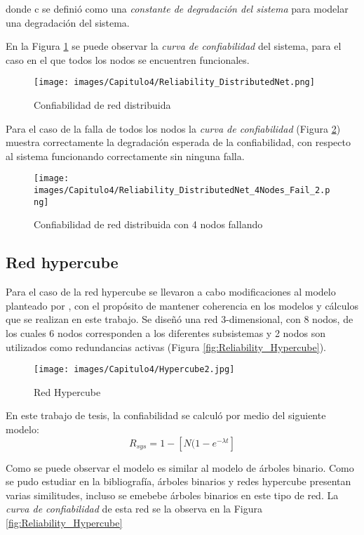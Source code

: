 donde c se definió como una \textit{constante de degradación del sistema} para modelar una degradación del sistema.

En la Figura \ref{fig:reliability_distributedNet} se puede observar la \textit{curva de confiabilidad} del sistema, para el caso en el que todos los nodos se encuentren funcionales.

\begin{figure}[H]
 \centering
 \texttt{[image: images/Capitulo4/Reliability\_DistributedNet.png]}
  \caption{Confiabilidad de red distribuida}
\label{fig:reliability_distributedNet}
\end{figure}


Para el caso de la falla de todos los nodos la \textit{curva de confiabilidad} (Figura \ref{fig:reliability_distributedNet_4Nodes_Fail}) muestra correctamente la degradación esperada de la confiabilidad, con respecto al sistema funcionando correctamente sin ninguna falla.

\begin{figure}[H]
 \centering
 \texttt{[image: images/Capitulo4/Reliability\_DistributedNet\_4Nodes\_Fail\_2.png]}
  \caption{Confiabilidad de red distribuida con 4 nodos fallando}
\label{fig:reliability_distributedNet_4Nodes_Fail}
\end{figure}

\subsection{Red hypercube}
Para el caso de la red hypercube se llevaron a cabo modificaciones al modelo planteado por \cite{Mostafa14}, con el propósito de mantener coherencia en los modelos y cálculos que se realizan en este trabajo. Se diseñó una red 3-dimensional, con 8 nodos,  de los cuales 6 nodos corresponden a los diferentes subsistemas y 2 nodos son utilizados como redundancias activas (Figura \ref{fig:Reliability_Hypercube}).

\begin{figure}[H]
 \centering
 \texttt{[image: images/Capitulo4/Hypercube2.jpg]}
  \caption{Red Hypercube}
\label{fig:Hypercube}
\end{figure}

En este trabajo de tesis, la confiabilidad se calculó por medio del siguiente modelo: $$R_{sys} = 1- [N (1 - e^{- \lambda t}]$$

Como se puede observar el modelo es similar al modelo de árboles binario. Como se pudo estudiar en la bibliografía, árboles binarios y redes hypercube presentan varias similitudes, incluso se emebebe árboles binarios en este tipo de red. La \textit{curva de confiabilidad} de esta red se la observa en la Figura \ref{fig:Reliability_Hypercube}


